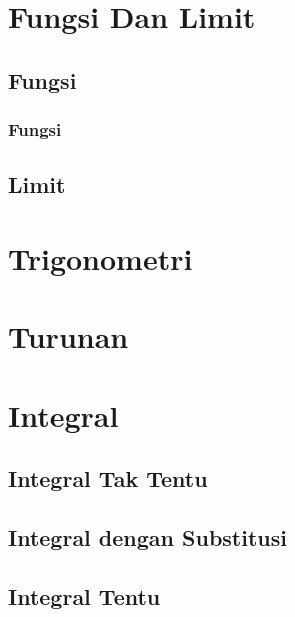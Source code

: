 \documentclass[pdflatex,compress,mathserif]{beamer}
\begin{document}
\section{Fungsi Dan Limit}

	\subsection{Fungsi}
	
		\begin{frame}
			\frametitle{Fungsi}
		\end{frame}
	\subsection{Limit}

\section{Trigonometri}

\section{Turunan}

\section{Integral}

	\subsection{Integral Tak Tentu}

	\subsection{Integral dengan Substitusi}
	
	\subsection{Integral Tentu}
\end{document}
